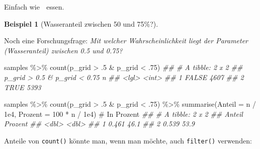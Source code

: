 \documentclass[
  a4paper,
  DIV=11]{scrreprt}
\newenvironment{Shaded}{\begin{snugshade}}{\end{snugshade}}
\newcommand{\AttributeTok}[1]{\textcolor[rgb]{0.40,0.45,0.13}{#1}}
\newcommand{\CommentTok}[1]{\textcolor[rgb]{0.37,0.37,0.37}{#1}}
\newcommand{\DecValTok}[1]{\textcolor[rgb]{0.68,0.00,0.00}{#1}}
\newcommand{\DocumentationTok}[1]{\textcolor[rgb]{0.37,0.37,0.37}{\textit{#1}}}
\newcommand{\FloatTok}[1]{\textcolor[rgb]{0.68,0.00,0.00}{#1}}
\newcommand{\FunctionTok}[1]{\textcolor[rgb]{0.28,0.35,0.67}{#1}}
\newcommand{\NormalTok}[1]{\textcolor[rgb]{0.00,0.23,0.31}{#1}}
\newcommand{\SpecialCharTok}[1]{\textcolor[rgb]{0.37,0.37,0.37}{#1}}
\theoremstyle{definition}
\newtheorem{example}{Beispiel}[chapter]
\theoremstyle{remark}
\begin{document}
Einfach wie 🍰 essen.

\leavevmode{}%
\begin{example}[Wasseranteil zwischen 50 und 75\%?]\label{exm-param2}

Noch eine Forschungsfrage: \emph{Mit welcher Wahrscheinlichkeit liegt
der Parameter (Wasseranteil) zwischen 0.5 und 0.75?}

\begin{Shaded}
\begin{Highlighting}[]
\NormalTok{samples }\SpecialCharTok{\%\textgreater{}\%} 
  \FunctionTok{count}\NormalTok{(p\_grid }\SpecialCharTok{\textgreater{}}\NormalTok{ .}\DecValTok{5} \SpecialCharTok{\&}\NormalTok{ p\_grid }\SpecialCharTok{\textless{}}\NormalTok{ .}\DecValTok{75}\NormalTok{)}
\DocumentationTok{\#\# \# A tibble: 2 x 2}
\DocumentationTok{\#\#   \textasciigrave{}p\_grid \textgreater{} 0.5 \& p\_grid \textless{} 0.75\textasciigrave{}     n}
\DocumentationTok{\#\#   \textless{}lgl\textgreater{}                          \textless{}int\textgreater{}}
\DocumentationTok{\#\# 1 FALSE                           4607}
\DocumentationTok{\#\# 2 TRUE                            5393}
\end{Highlighting}
\end{Shaded}

\begin{Shaded}
\begin{Highlighting}[]
\NormalTok{samples }\SpecialCharTok{\%\textgreater{}\%} 
  \FunctionTok{count}\NormalTok{(p\_grid }\SpecialCharTok{\textgreater{}}\NormalTok{ .}\DecValTok{5} \SpecialCharTok{\&}\NormalTok{ p\_grid }\SpecialCharTok{\textless{}}\NormalTok{ .}\DecValTok{75}\NormalTok{) }\SpecialCharTok{\%\textgreater{}\%} 
  \FunctionTok{summarise}\NormalTok{(}\AttributeTok{Anteil =}\NormalTok{ n }\SpecialCharTok{/} \FloatTok{1e4}\NormalTok{,}
            \AttributeTok{Prozent =} \DecValTok{100} \SpecialCharTok{*}\NormalTok{ n }\SpecialCharTok{/} \FloatTok{1e4}\NormalTok{)  }\CommentTok{\# In Prozent}
\DocumentationTok{\#\# \# A tibble: 2 x 2}
\DocumentationTok{\#\#   Anteil Prozent}
\DocumentationTok{\#\#    \textless{}dbl\textgreater{}   \textless{}dbl\textgreater{}}
\DocumentationTok{\#\# 1  0.461    46.1}
\DocumentationTok{\#\# 2  0.539    53.9}
\end{Highlighting}
\end{Shaded}

Anteile von \texttt{count()} könnte man, wenn man möchte, auch
\texttt{filter()} verwenden:


\end{example}
\end{document}
